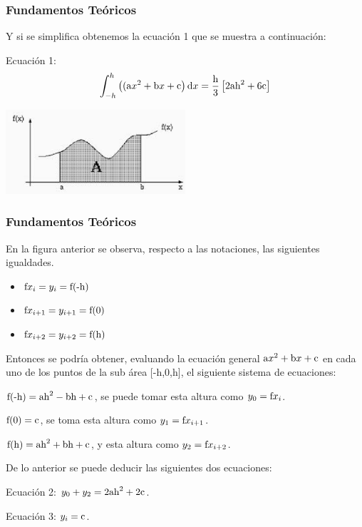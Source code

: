 \documentclass{beamer}
\begin{document}
\begin{frame}
\frametitle{Fundamentos Teóricos}

    		
	Y si se simplifica obtenemos la ecuación 1 que se muestra a continuación:
		
	Ecuación 1: \[\int_{-h}^{h}\left((\textup{a}x^2 + \textup{b}x + \textup{c}\right)\textup{d}x=\frac{\textup{h}}{3}\left[2\textup{a}\textup{h}^2  +  6\textup{c}\right]\]

\bigskip

\begin{center}
\includegraphics[width=0.5\textwidth]{img/ima3.eps}
\end{center}

\end{frame}
\begin{frame}
\frametitle{Fundamentos Teóricos}

	En la figura anterior se observa, respecto a las notaciones, las siguientes igualdades.
	
	\begin{itemize}
    \item $ \textup{f}x_{i}=y_{i}=\textup{f}\textup{(-h)} $
    \pause
    \item $ \textup{f}x_{i+1}=y_{i+1}=\textup{f}(0) $
    \pause
    \item $ \textup{f}x_{i+2}=y_{i+2}=\textup{f}\textup{(h)} $
    \pause
    \end{itemize}

    

	Entonces se podría obtener, evaluando la ecuación general $ \textup{a}x^2 + \textup{b}x + \textup{c} $ en cada uno de los puntos de la sub área [-h,0,h], el siguiente sistema de ecuaciones:
	
	$ \textup{f}\textup{(-h)}=\textup{a}\textup{h}^2 - \textup{b}\textup{h} + \textup{c} $, se puede tomar esta altura como $ y_{0}=\textup{f}x_{i}$.
	
	
	$ \textup{f}(0)=\textup{c} $, se toma esta altura como $ y_{1}=\textup{f}x_{i+1} $.
	
	
	$ \textup{f}\textup{(h)}=\textup{a}\textup{h}^2 + \textup{b}\textup{h} + \textup{c} $, y esta altura como $ 
	y_{2}=\textup{f}x_{i+2}$.

	De lo anterior se puede deducir las siguientes dos ecuaciones:

	
	Ecuación 2: $ y_{0} + y_{2} = 2\textup{a}\textup{h}^2 + 2\textup{c} $.

	
	Ecuación 3: $ y_{i}=\textup{c} $.

\end{frame}
\end{document}
